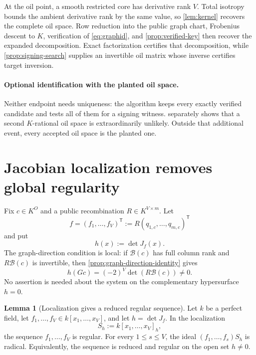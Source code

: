\documentclass[11pt,a4paper]{article}
\theoremstyle{definition}
\newtheorem{lemma}[theorem]{Lemma}
\theoremstyle{remark}
\begin{document}
At the oil point, a smooth restricted core has derivative rank $V$.  Total isotropy bounds the ambient derivative rank by the same value, so \cref{lem:kernel} recovers the complete oil space.  Row reduction into the public graph chart, Frobenius descent to $K$, verification of \eqref{eq:graphid}, and \cref{prop:verified-key} then recover the expanded decomposition.  Exact factorization certifies that decomposition, while \cref{prop:signing-search} supplies an invertible oil matrix whose inverse certifies target inversion.

\paragraph{Optional identification with the planted oil space.}
Neither endpoint needs uniqueness: the algorithm keeps every exactly verified candidate and tests all of them for a signing witness.   separately shows that a second $K$-rational oil space is extraordinarily unlikely.  Outside that additional event, every accepted oil space is the planted one.

\section{Jacobian localization removes global regularity}\label{sec:local-geometry}

Fix $c\in K^O$ and a public recombination $R\in K^{V\times m}$.  Let
\[
 f=(f_1,\ldots,f_V)^{\mathsf T}:=R(q_{1,c},\ldots,q_{m,c})^{\mathsf T}
\]
and put
\begin{equation}\label{eq:local-jacobian-polynomial}
 h(x):=\det J_f(x).
\end{equation}
The graph-direction condition is local: if $\mathcal B(c)$ has full column rank and $R\mathcal B(c)$ is invertible, then \cref{prop:graph-direction-identity} gives
\begin{equation}\label{eq:h-at-planted}
 h(Gc)=(-2)^V\det(R\mathcal B(c))\ne0.
\end{equation}
No assertion is needed about the system on the complementary hypersurface $h=0$.

\begin{lemma}[Localization gives a reduced regular sequence]\label{lem:jacobian-localization}
Let $k$ be a perfect field, let $f_1,\ldots,f_V\in k[x_1,\ldots,x_V]$, and let $h=\det J_f$.  In the localization
\[
 S_h:=k[x_1,\ldots,x_V]_h,
\]
the sequence $f_1,\ldots,f_V$ is regular.  For every $1\le s\le V$, the ideal $(f_1,\ldots,f_s)S_h$ is radical.  Equivalently, the sequence is reduced and regular on the open set $h\ne0$.
\end{lemma}
\end{document}
